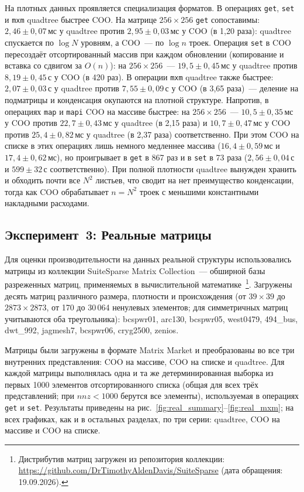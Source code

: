 \documentclass[a4paper]{article}
\begin{document}
На плотных данных проявляется специализация форматов. В операциях \texttt{get}, \texttt{set} и \texttt{mxm} quadtree быстрее COO. На матрице $256\times256$ \texttt{get} сопоставимы: $2{,}46 \pm 0{,}07$\,мс у quadtree против $2{,}95 \pm 0{,}03$\,мс у COO (в 1,20 раза): quadtree спускается по $\log N$ уровням, а COO~--- по $\log n$ троек. Операция \texttt{set} в COO пересоздаёт отсортированный массив при каждом обновлении (копирование и вставка со сдвигом за $O(n)$): на $256\times256$~--- $19{,}5 \pm 0{,}45$\,мс у quadtree против $8{,}19 \pm 0{,}45$\,с у COO (в 420 раз). В операции \texttt{mxm} quadtree также быстрее: $2{,}07 \pm 0{,}03$\,с у quadtree против $7{,}55 \pm 0{,}09$\,с у COO (в 3,65 раза)~--- деление на подматрицы и конденсация окупаются на плотной структуре. Напротив, в операциях \texttt{map} и \texttt{mapi} COO на массиве быстрее: на $256\times256$~--- $10{,}5 \pm 0{,}35$\,мс у COO против $22{,}7 \pm 0{,}43$\,мс у quadtree (в 2,15 раза) и $10{,}7 \pm 0{,}47$\,мс у COO против $25{,}4 \pm 0{,}82$\,мс у quadtree (в 2,37 раза) соответственно. При этом COO на списке в этих операциях лишь немного медленнее массива ($16{,}4 \pm 0{,}59$\,мс и $17{,}4 \pm 0{,}62$\,мс), но проигрывает в \texttt{get} в 867 раз и в \texttt{set} в 73 раза ($2{,}56 \pm 0{,}04$\,с и $599 \pm 32$\,с соответственно). При полной плотности quadtree вынужден хранить и обходить почти все $N^2$ листьев, что сводит на нет преимущество конденсации, тогда как COO обрабатывает $n=N^2$ троек с меньшими константными накладными расходами.

\subsection{Эксперимент~3: Реальные матрицы}

Для оценки производительности на данных реальной структуры использовались матрицы из коллекции SuiteSparse Matrix Collection~--- обширной базы разреженных матриц, применяемых в вычислительной математике~\footnote{Дистрибутив матриц загружен из репозитория коллекции: \url{https://github.com/DrTimothyAldenDavis/SuiteSparse} (дата обращения: 19.09.2026).}. Загружены десять матриц различного размера, плотности и происхождения (от $39\times39$ до $2873\times2873$, от 170 до 30\,064 ненулевых элементов; для симметричных матриц учитываются оба треугольника): bcspwr01, arc130, bcspwr05, west0479, 494\_bus, dwt\_992, jagmesh7, bcspwr06, cryg2500, zenios.

Матрицы были загружены в формате Matrix Market и преобразованы во все три внутренних представления: COO на массиве, COO на списке и quadtree. Для каждой матрицы выполнялась одна и та же детерминированная выборка из первых 1000 элементов отсортированного списка (общая для всех трёх представлений; при $nnz < 1000$ берутся все элементы), используемая в операциях \texttt{get} и \texttt{set}. Результаты приведены на рис.~\ref{fig:real_summary}--\ref{fig:real_mxm}; на всех графиках, как и в остальных разделах, по три серии: quadtree, COO на массиве и COO на списке.
\end{document}
